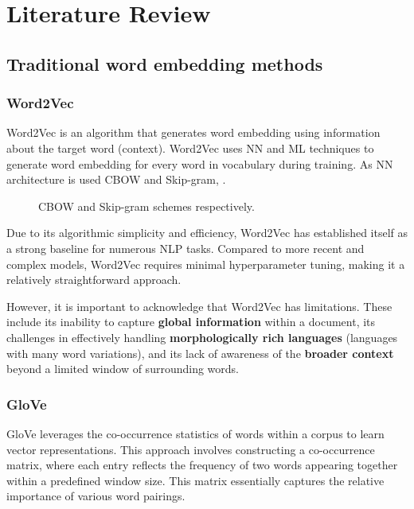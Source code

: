 
\chapter{Literature Review\label{chap:literature_review}}

\section{Traditional word embedding methods}

\subsection{Word2Vec}
Word2Vec \cite{mikolov2013efficient} is an algorithm that generates word embedding using information about the target word (context).
Word2Vec uses \ac{NN} and \ac{ML} techniques to generate word embedding for every word in vocabulary during training.
As \ac{NN} architecture is used \ac{CBOW} and Skip-gram, .

\begin{figure}[h]
 \centering
    
    
 \caption{\ac{CBOW} and Skip-gram schemes respectively.}
    \label{fig:cbow_skipgram_scheme}
\end{figure} 

Due to its algorithmic simplicity and efficiency, Word2Vec has established itself as a strong baseline for numerous \ac{NLP} tasks.
Compared to more recent and complex models, Word2Vec requires minimal hyperparameter tuning, making it a relatively straightforward approach.

However, it is important to acknowledge that Word2Vec has limitations.
These include its inability to capture \textbf{global information} within a document, its challenges in effectively handling \textbf{morphologically rich languages} (languages with many word variations), and its lack of awareness of the \textbf{broader context} beyond a limited window of surrounding words.

\subsection{\acf{GloVe}}
\ac{GloVe} \cite{pennington2014glove} leverages the co-occurrence statistics of words within a corpus to learn vector representations.
This approach involves constructing a co-occurrence matrix, where each entry reflects the frequency of two words appearing together within a predefined window size.
This matrix essentially captures the relative importance of various word pairings.

